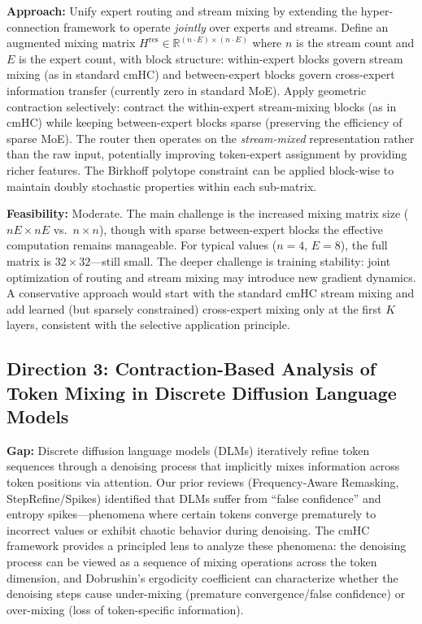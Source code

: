 \documentclass[11pt,a4paper]{article}
\begin{document}
\textbf{Approach:} Unify expert routing and stream mixing by extending the hyper-connection framework to operate \emph{jointly} over experts and streams. Define an augmented mixing matrix $H^{\mathrm{res}} \in \mathbb{R}^{(n \cdot E) \times (n \cdot E)}$ where $n$ is the stream count and $E$ is the expert count, with block structure: within-expert blocks govern stream mixing (as in standard cmHC) and between-expert blocks govern cross-expert information transfer (currently zero in standard MoE). Apply geometric contraction selectively: contract the within-expert stream-mixing blocks (as in cmHC) while keeping between-expert blocks sparse (preserving the efficiency of sparse MoE). The router then operates on the \emph{stream-mixed} representation rather than the raw input, potentially improving token-expert assignment by providing richer features. The Birkhoff polytope constraint can be applied block-wise to maintain doubly stochastic properties within each sub-matrix.

\textbf{Feasibility:} Moderate. The main challenge is the increased mixing matrix size ($nE \times nE$ vs.\ $n \times n$), though with sparse between-expert blocks the effective computation remains manageable. For typical values ($n{=}4$, $E{=}8$), the full matrix is $32 \times 32$---still small. The deeper challenge is training stability: joint optimization of routing and stream mixing may introduce new gradient dynamics. A conservative approach would start with the standard cmHC stream mixing and add learned (but sparsely constrained) cross-expert mixing only at the first $K$ layers, consistent with the selective application principle.

\subsection{Direction 3: Contraction-Based Analysis of Token Mixing in Discrete Diffusion Language Models}
\textbf{Gap:} Discrete diffusion language models (DLMs) iteratively refine token sequences through a denoising process that implicitly mixes information across token positions via attention. Our prior reviews (Frequency-Aware Remasking, StepRefine/Spikes) identified that DLMs suffer from ``false confidence'' and entropy spikes---phenomena where certain tokens converge prematurely to incorrect values or exhibit chaotic behavior during denoising. The cmHC framework provides a principled lens to analyze these phenomena: the denoising process can be viewed as a sequence of mixing operations across the token dimension, and Dobrushin's ergodicity coefficient can characterize whether the denoising steps cause under-mixing (premature convergence/false confidence) or over-mixing (loss of token-specific information).
\end{document}
